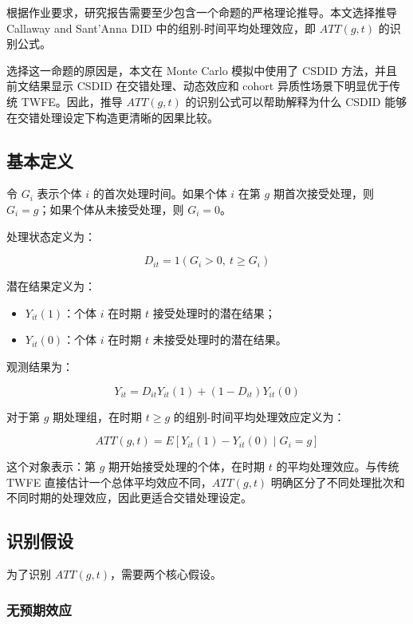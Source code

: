 \documentclass[
  fontset=windows]{ctexart}
\providecommand{\tightlist}{%
  \setlength{\itemsep}{0pt}\setlength{\parskip}{0pt}}
\begin{document}
根据作业要求，研究报告需要至少包含一个命题的严格理论推导。本文选择推导
Callaway and Sant'Anna DID 中的组别-时间平均处理效应，即 \(ATT(g,t)\)
的识别公式。

选择这一命题的原因是，本文在 Monte Carlo 模拟中使用了 CSDID
方法，并且前文结果显示 CSDID 在交错处理、动态效应和 cohort
异质性场景下明显优于传统 TWFE。因此，推导 \(ATT(g,t)\)
的识别公式可以帮助解释为什么 CSDID
能够在交错处理设定下构造更清晰的因果比较。

\subsection{基本定义}\label{ux57faux672cux5b9aux4e49}

令 \(G_i\) 表示个体 \(i\) 的首次处理时间。如果个体 \(i\) 在第 \(g\)
期首次接受处理，则 \(G_i=g\)；如果个体从未接受处理，则 \(G_i=0\)。

处理状态定义为：

\[
D_{it}=1(G_i>0,\ t\geq G_i)
\]

潜在结果定义为：

\begin{itemize}
\tightlist
\item
  \(Y_{it}(1)\)：个体 \(i\) 在时期 \(t\) 接受处理时的潜在结果；
\item
  \(Y_{it}(0)\)：个体 \(i\) 在时期 \(t\) 未接受处理时的潜在结果。
\end{itemize}

观测结果为：

\[
Y_{it}=D_{it}Y_{it}(1)+(1-D_{it})Y_{it}(0)
\]

对于第 \(g\) 期处理组，在时期 \(t\geq g\)
的组别-时间平均处理效应定义为：

\[
ATT(g,t)=E[Y_{it}(1)-Y_{it}(0)\mid G_i=g]
\]

这个对象表示：第 \(g\) 期开始接受处理的个体，在时期 \(t\)
的平均处理效应。与传统 TWFE 直接估计一个总体平均效应不同，\(ATT(g,t)\)
明确区分了不同处理批次和不同时期的处理效应，因此更适合交错处理设定。

\subsection{识别假设}\label{ux8bc6ux522bux5047ux8bbe}

为了识别 \(ATT(g,t)\)，需要两个核心假设。

\subsubsection{无预期效应}\label{ux65e0ux9884ux671fux6548ux5e94}
\end{document}
